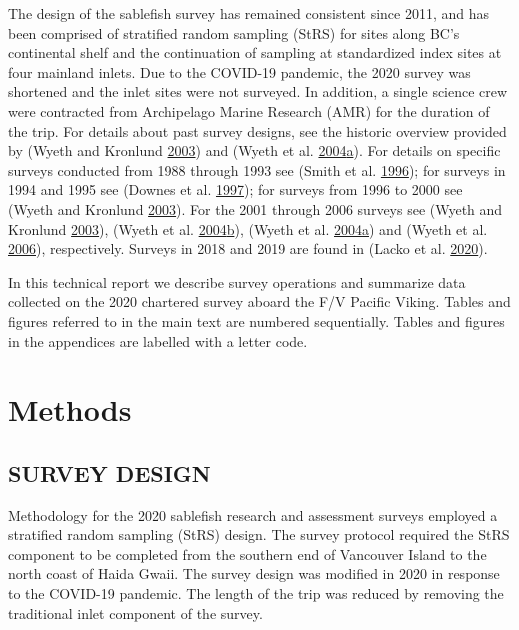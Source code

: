 \documentclass[12pt]{article}\usepackage[]{graphicx}\usepackage[]{color}
\begin{document}
The design of the sablefish survey has remained consistent since 2011, and has been comprised of stratified random sampling (StRS) for sites along BC's continental shelf and the continuation of sampling at standardized index sites at four mainland inlets. Due to the COVID-19 pandemic, the 2020 survey was shortened and the inlet sites were not surveyed. In addition, a single science crew were contracted from Archipelago Marine Research (AMR) for the duration of the trip. For details about past survey designs, see the historic overview provided by (Wyeth and Kronlund \protect\hyperlink{ref-Wyeth2003}{2003}) and (Wyeth et al. \protect\hyperlink{ref-Wyeth2004b}{2004}\protect\hyperlink{ref-Wyeth2004b}{a}). For details on specific surveys conducted from 1988 through 1993 see (Smith et al. \protect\hyperlink{ref-Smith1996}{1996}); for surveys in 1994 and 1995 see (Downes et al. \protect\hyperlink{ref-Downes1997}{1997}); for surveys from 1996 to 2000 see (Wyeth and Kronlund \protect\hyperlink{ref-Wyeth2003}{2003}). For the 2001 through 2006 surveys see (Wyeth and Kronlund \protect\hyperlink{ref-Wyeth2003}{2003}), (Wyeth et al. \protect\hyperlink{ref-Wyeth2004a}{2004}\protect\hyperlink{ref-Wyeth2004a}{b}), (Wyeth et al. \protect\hyperlink{ref-Wyeth2004b}{2004}\protect\hyperlink{ref-Wyeth2004b}{a}) and (Wyeth et al. \protect\hyperlink{ref-Wyeth2006}{2006}), respectively. Surveys in 2018 and 2019 are found in (Lacko et al. \protect\hyperlink{ref-Lacko2020}{2020}).

In this technical report we describe survey operations and summarize data collected on the 2020 chartered survey aboard the F/V Pacific Viking. Tables and figures referred to in the main text are numbered sequentially. Tables and figures in the appendices are labelled with a letter code. \clearpage

\hypertarget{methods}{%
\section{Methods}\label{methods}}

\hypertarget{survey-design}{%
\subsection{SURVEY DESIGN}\label{survey-design}}

Methodology for the 2020 sablefish research and assessment surveys employed a stratified random sampling (StRS) design. The survey protocol required the StRS component to be completed from the southern end of Vancouver Island to the north coast of Haida Gwaii. The survey design was modified in 2020 in response to the COVID-19 pandemic. The length of the trip was reduced by removing the traditional inlet component of the survey.
\end{document}
